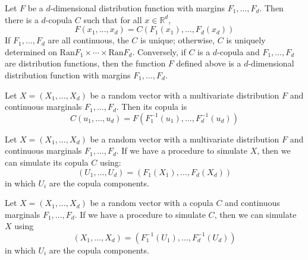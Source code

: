 \documentclass[11pt,fleqn]{book} %
\begin{document}
\begin{theorem}
	\label{thm:sklar}
	Let $F$ be a $d$-dimensional distribution function with margins 
	$F_1,\dots,F_d$. Then there is a $d$-copula $C$ such that for all 
	$x \in \mathbb{R}^d$,
	\begin{displaymath}
		F(x_1,\dots,x_d) = C(F_1(x_1),\dots,F_d(x_d))
	\end{displaymath}
	If $F_1,\dots,F_d$ are all continuous, the $C$ is unique; otherwise, $C$ is 
	uniquely determined on $\text{Ran}F_1 \times \cdots \times \text{Ran}F_d$.
	Conversely, if $C$ is a $d$-copula and $F_1,\dots,F_d$ are distribution 
	functions, then the function $F$ defined above is a $d$-dimensional 
	distribution function with margins $F_1,\dots,F_d$.
\end{theorem}

\begin{corollary}
	\label{cor:cop1}
	Let $X=(X_1, \dots, X_d)$ be a random vector with a multivariate 
	distribution $F$ and continuous marginals $F_1, \dots, F_d$. 
	Then its copula is
	\begin{displaymath}
		C(u_1,\dots,u_d) = F(F_1^{-1}(u_1), \dots, F_d^{-1}(u_d))
	\end{displaymath}
\end{corollary}

\begin{corollary}
	\label{cor:cop2}
	Let $X=(X_1, \dots, X_d)$ be a random vector with a multivariate 
	distribution $F$ and continuous marginals $F_1, \dots, F_d$.
	If we have a procedure to simulate $X$, then we can simulate 
	its copula $C$ using:
	\begin{displaymath}
		(U_1, \dots, U_d) = (F_1(X_1), \dots, F_d(X_d))
	\end{displaymath}
	in which $U_i$ are the copula components.
\end{corollary}

\begin{corollary}
	\label{cor:cop3}
	Let $X=(X_1, \dots, X_d)$ be a random vector with a copula $C$
	and continuous marginals $F_1, \dots, F_d$. If we have a
	procedure to simulate $C$, then we can simulate $X$ using
	\begin{displaymath}
		(X_1, \dots, X_d) = (F_1^{-1}(U_1), \dots, F_d^{-1}(U_d))
	\end{displaymath}
	in which $U_i$ are the copula components.
\end{corollary}
\end{document}
